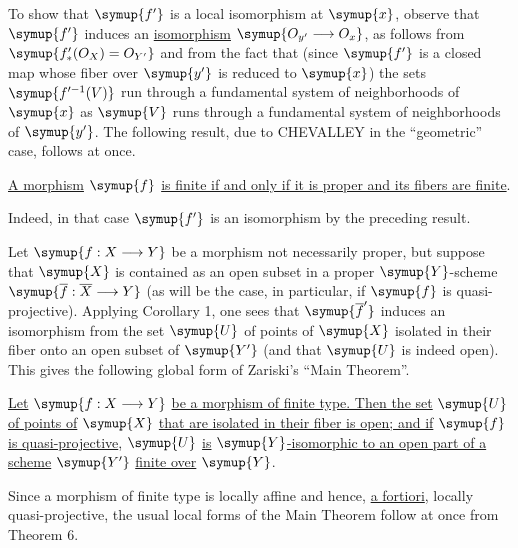 To show that $\symup{f'}$ is a local isomorphism at $\symup{x}$, observe that $\symup{f'}$ induces an
\uline{isomorphism} $\symup{O_{y'}\longrightarrow O_x}$, as follows from
$\symup{f'_*(O_X)=O_{Y'}}$ and from the fact that (since $\symup{f'}$ is a closed map
whose fiber over $\symup{y'}$ is reduced to $\symup{x}$) the sets $\symup{f'^{-1}(V)}$ run through a
fundamental system of neighborhoods of $\symup{x}$ as $\symup{V}$ runs through a fundamental
system of neighborhoods of $\symup{y'}$. The following result, due to CHEVALLEY in the
“geometric” case, follows at once.

 \uline{A morphism} $\symup{f}$ \uline{is finite if and only if it is proper and
its fibers are finite}.

Indeed, in that case $\symup{f'}$ is an isomorphism by the preceding result.

Let $\symup{f:X\longrightarrow Y}$ be a morphism not necessarily proper, but suppose
that $\symup{X}$ is contained as an open subset in a proper $\symup{Y}$-scheme
$\symup{\overline f:\overline X\longrightarrow Y}$ (as will be the case, in
particular, if $\symup{f}$ is quasi-projective). Applying Corollary 1, one sees that
$\symup{\overline f'}$ induces an isomorphism from the set $\symup{U}$ of points of $\symup{X}$
isolated in their fiber onto an open subset of $\symup{Y'}$ (and that $\symup{U}$ is indeed
open). This gives the following global form of Zariski's “Main Theorem”.

 \uline{Let}
$\symup{f:X\longrightarrow Y}$ \uline{be a morphism of finite type. Then the set} $\symup{U}$ \uline{of
points of} $\symup{X}$ \uline{that are isolated in their fiber is open; and if} $\symup{f}$ \uline{is
quasi-projective}, $\symup{U}$ \uline{is}
$\symup{Y}$\uline{-isomorphic to an open part of a scheme} $\symup{Y'}$ \uline{finite over} $\symup{Y}$.

Since a morphism of finite type is locally affine and hence,
\uline{a fortiori}, locally quasi-projective, the usual local forms of the
Main Theorem follow at once from Theorem 6.


